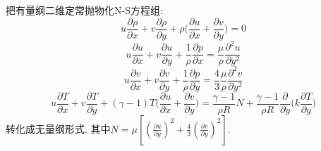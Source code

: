 \begin{problem}[问题1]
把有量纲二维定常抛物化N-S方程组:
\begin{equation}\label{eq:NS01}
u\frac{\partial\rho}{\partial x}
+ v\frac{\partial\rho}{\partial y}
+ \rho\Big(\frac{\partial u}{\partial x} + \frac{\partial v}{\partial y}\Big)
=0
\end{equation}
\begin{equation}\label{eq:NS02}
u\frac{\partial u}{\partial x} + v\frac{\partial u}{\partial y}
+ \frac{1}{\rho}\frac{\partial p}{\partial x} = \frac{\mu}{\rho}\frac{\partial^2 u}{\partial y^2}
\end{equation}
\begin{equation}\label{eq:NS03}
u\frac{\partial v}{\partial x} + v\frac{\partial v}{\partial y}
+\frac{1}{\rho}\frac{\partial p}{\partial y}
=\frac{4}{3}\frac{\mu}{\rho}\frac{\partial^2v}{\partial y^2}
\end{equation}
\begin{equation}\label{eq:NS04}
u\frac{\partial T}{\partial x} + v\frac{\partial T}{\partial y}
+(\gamma-1)T\Big(\frac{\partial u}{\partial x} + \frac{\partial v}{\partial y }\Big)
=\frac{\gamma - 1}{\rho R}N + \frac{\gamma-1}{\rho R}\frac{\partial}{\partial y}\Big(k\frac{\partial T}{\partial y}\Big)
\end{equation}
转化成无量纲形式. 其中$N=\mu [ (\frac{\partial u}{\partial y})^2 + \frac{4}{3}(\frac{\partial v}{\partial y})^2]$.
\end{problem}

